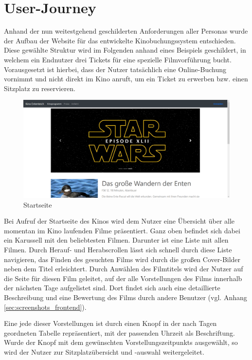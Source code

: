\section{User-Journey}
\label{sec:user_journey}
Anhand der nun weitestgehend geschilderten Anforderungen aller Personas wurde der Aufbau der Website für das entwickelte Kinobuchungssystem entschieden.
Diese gewählte Struktur wird im Folgenden anhand eines Beispiels geschildert, in welchem ein Endnutzer drei Tickets für eine spezielle Filmvorführung bucht.
Vorausgesetzt ist hierbei, dass der Nutzer tatsächlich eine Online-Buchung vornimmt und nicht direkt im Kino anruft, um ein Ticket zu erwerben bzw. einen Sitzplatz zu reservieren.

\begin{figure}[ht]
	\centering
	\includegraphics[width=\textwidth]{img/screenshots/startseite00}
	\captionsetup{format=hang}
	\caption{Startseite}
	\label{fig:startseite00}
\end{figure}

Bei Aufruf der Startseite des Kinos wird dem Nutzer eine Übersicht über alle momentan im Kino laufenden Filme präsentiert.
Ganz oben befindet sich dabei ein Karussell mit den beliebtesten Filmen.
Darunter ist eine Liste mit allen Filmen.
Durch Herauf- und Herabscrollen lässt sich schnell durch diese Liste navigieren, das Finden des gesuchten Films wird durch die großen Cover-Bilder neben dem Titel erleichtert.
Durch Anwählen des Filmtitels wird der Nutzer auf die Seite für diesen Film geleitet, auf der alle Vorstellungen des Films innerhalb der nächsten Tage aufgelistet sind.
Dort findet sich auch eine detaillierte Beschreibung und eine Bewertung des Films durch andere Benutzer (vgl. Anhang \vref{sec:screenshots_frontend}).

Eine jede dieser Vorstellungen ist durch einen Knopf in der nach Tagen geordneten Tabelle repräsentiert, mit der passenden Uhrzeit als Beschriftung.
Wurde der Knopf mit dem gewünschten Vorstellungszeitpunkts ausgewählt, so wird der Nutzer zur Sitzplatzübersicht und -auswahl weitergeleitet.

